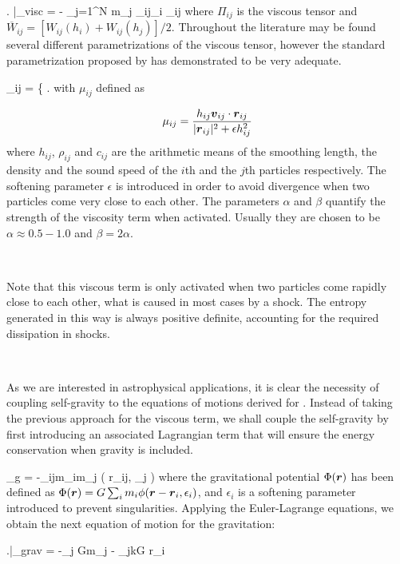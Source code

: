 \documentclass[a4,useAMS,usenatbib,usegraphicx,12pt]{article}
\begin{document}
{ \left. \right|_{\mbox{\footnotesize visc}} =
- \sum_{j=1}^N m_j \Pi_{ij}\nabla_i _{ij} }
where $\Pi_{ij}$ is the viscous tensor and $\overline{W}_{ij} = [W_{ij}(h_i)+
W_{ij}(h_j)]/2$. Throughout the literature may be found several different 
parametrizations of the viscous tensor, however the standard parametrization
proposed by \citet{Monaghan83} has demonstrated to be very adequate.

{ \Pi_{ij} = \left\{ \right. }
with $\mu_{ij}$ defined as

\[ \mu_{ij} = \frac{h_{ij}\boldsymbol{ v }_{ij}\cdot \boldsymbol{ r }_{ij}}{|\boldsymbol{ r }_{ij}|^2 + 
\epsilon h_{ij}^2} \]
where $h_{ij}$, $\rho_{ij}$ and $c_{ij}$ are the arithmetic means of the smoothing
length, the density and the sound speed of the $i$th and the $j$th particles 
respectively. The softening parameter $\epsilon$ is introduced in order to avoid
divergence when two particles come very close to each other. The parameters 
$\alpha$ and $\beta$ quantify the strength of the viscosity term when activated.
Usually they are chosen to be $\alpha \approx 0.5-1.0 $ and $\beta=2\alpha$.

\

Note that this viscous term is only activated when two particles come rapidly 
close to each other, what is caused in most cases by a shock. The entropy 
generated in this way is always positive definite, accounting for the required
dissipation in shocks.

\

As we are interested in astrophysical applications, it is clear the necessity 
of coupling self-gravity to the equations of motions derived for \SPH. Instead 
of taking the previous approach for the viscous term, we shall couple the
self-gravity by first introducing an associated Lagrangian term that will
ensure the energy conservation when gravity is included.

{ _g = -\sum_{i\neq j}m_im_j \phi( r_{ij}, \epsilon_j ) }
where the gravitational potential $\Phi(\boldsymbol{ r })$ has been defined as 
$\Phi(\boldsymbol{ r }) = G \sum_i m_i \phi(\boldsymbol{ r } - \boldsymbol{ r }_i, \epsilon_i)$, and $\epsilon_i$
is a softening parameter introduced to prevent singularities. Applying the 
Euler-Lagrange equations, we obtain the next equation of motion for the 
gravitation:


{ \left.\right|_{\mbox{\footnotesize{grav}}} = 
-\sum_j Gm_j  - \sum_{j\neq k}G
{\partial \bds r_i} }
\end{document}
